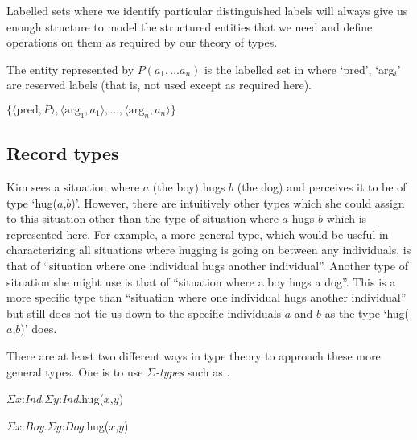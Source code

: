   
Labelled sets where we identify particular distinguished labels will
always give us enough structure to model the structured entities that
we need and define operations on them as required by our theory of types.

The entity 
represented by $P(a_1,\ldots a_n)$ is the
labelled set in \nexteg{} where `pred', `arg$_i$' are reserved labels
(that is, not used except as
required here).
\begin{ex}
$\{\langle\mathrm{pred},P\rangle,\langle\mathrm{arg}_1,a_1\rangle,\ldots,\langle\mathrm{arg}_n,a_n\rangle\}$
\end{ex}



\subsection{Record types}
\label{sec:rectypes}
Kim sees a situation where $a$ (the boy) hugs $b$ (the dog) and
perceives it to be of type `hug($a$,$b$)'.  However, there are
intuitively other types which she could assign to this situation other
than the type of situation where $a$ hugs $b$ which is represented
here.  For example, a more general type, which would be useful in
characterizing all situations where hugging is going on between any
individuals, is that of ``situation where one
individual hugs another individual''.  Another type of situation she
might use is that of ``situation where a boy hugs a dog''.  This is a
more specific type than ``situation where one
individual hugs another individual'' but still does not tie us down to
the specific individuals $a$ and $b$ as the type `hug($a$,$b$)' does.

There are at least two different ways in type theory to approach
these more general types.  One is to use \textit{$\Sigma$-types} \label{pg:sigmatypes} such
as \nexteg{}.
\begin{ex} 
\begin{subex} 
 
\item $\Sigma x$:\textit{Ind}.$\Sigma y$:\textit{Ind}.hug($x$,$y$)
 
\item $\Sigma x$:\textit{Boy}.$\Sigma y$:\textit{Dog}.hug($x$,$y$) 
 
\end{subex} 
   
\end{ex}
  
